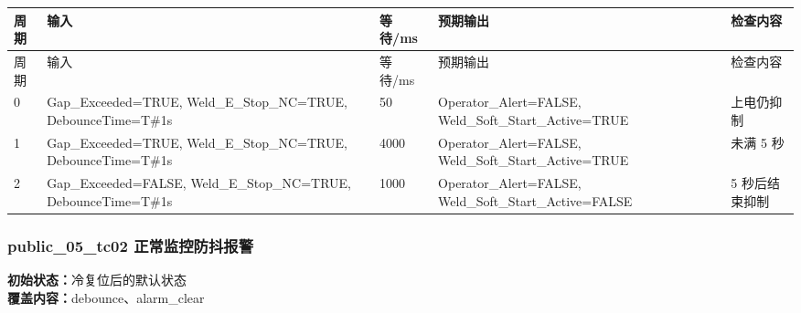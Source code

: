 \begin{longtable}{L{1.0cm}L{4.7cm}L{1.4cm}L{4.0cm}L{2.1cm}}

\toprule

周期 & 输入 & 等待/ms & 预期输出 & 检查内容\\

\midrule

\endfirsthead

\toprule

周期 & 输入 & 等待/ms & 预期输出 & 检查内容\\

\midrule

\endhead

0 & Gap\_Exceeded=TRUE, Weld\_E\_Stop\_NC=TRUE, DebounceTime=T\#1s & 50 & Operator\_Alert=FALSE, Weld\_Soft\_Start\_Active=TRUE & 上电仍抑制\\

1 & Gap\_Exceeded=TRUE, Weld\_E\_Stop\_NC=TRUE, DebounceTime=T\#1s & 4000 & Operator\_Alert=FALSE, Weld\_Soft\_Start\_Active=TRUE & 未满 5 秒\\

2 & Gap\_Exceeded=FALSE, Weld\_E\_Stop\_NC=TRUE, DebounceTime=T\#1s & 1000 & Operator\_Alert=FALSE, Weld\_Soft\_Start\_Active=FALSE & 5 秒后结束抑制\\

\bottomrule

\end{longtable}

\subsubsection{{\ttfamily public\_05\_tc02} 正常监控防抖报警}

\noindent\textbf{初始状态：}冷复位后的默认状态\\

\textbf{覆盖内容：}debounce、alarm\_clear

